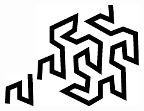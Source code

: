 \documentclass[12pt,openany,a4,usenames,dvipsnames]{book}
\begin{document}
\begin{figure}[H]
  \centering
  \begin{minipage}{\textwidth}
  \begin{minipage}{0.30\textwidth}
    \hfill
    \includegraphics[width=\textwidth,keepaspectratio]{figures/gosper1.pdf}
    \hfill
  \end{minipage}
  \hspace{0.028\textwidth}
  \begin{minipage}{0.30\textwidth}
    \hfill
    \includegraphics[width=\textwidth,keepaspectratio]{figures/gosper2.pdf}

\end{minipage}
\end{minipage}
\end{figure}
\end{document}
